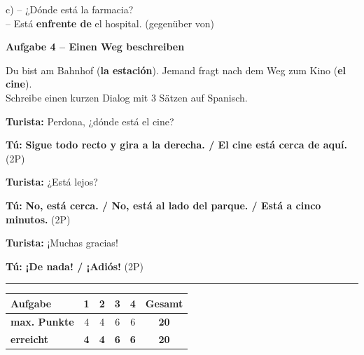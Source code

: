 \documentclass[11pt, a4paper]{article}
\newcommand{\fachfarbe}{spanisch}
\newcommand{\punktebox}[1]{\hfill\fbox{\small \_/#1}}
\newcommand{\lsg}[1]{\textcolor{loesung}{\textbf{#1}}}
\newenvironment{aufgabe}[1]{%
    \needspace{5\baselineskip}%
    \nopagebreak[4]%
    \vspace{10pt}
    \noindent\textbf{\textcolor{\fachfarbe}{Aufgabe #1}}
    \nopagebreak[4]%
    \vspace{5pt}
    \nopagebreak[4]%
    \begin{list}{}{\leftmargin=0pt}
    \item[]
}{%
    \end{list}
}
\newcommand{\es}[1]{\textcolor{\fachfarbe}{\textbf{#1}}}
\begin{document}
\noindent
c) -- ¿Dónde está la farmacia?\\
\hspace*{0.5cm} -- Está \lsg{enfrente de} el hospital. (gegenüber von)

\vspace{15pt}


\begin{aufgabe}{4 -- Einen Weg beschreiben}
Du bist am Bahnhof (\es{la estación}). Jemand fragt nach dem Weg zum Kino (\es{el cine}).\\
Schreibe einen kurzen Dialog mit 3 Sätzen auf Spanisch. \punktebox{6}
\end{aufgabe}

\noindent
\textbf{Turista:} Perdona, ¿dónde está el cine?

\vspace{0.8em}

\noindent
\textbf{Tú:} \lsg{Sigue todo recto y gira a la derecha. / El cine está cerca de aquí.} \hfill (2P)

\vspace{1.2em}

\noindent
\textbf{Turista:} ¿Está lejos?

\vspace{0.8em}

\noindent
\textbf{Tú:} \lsg{No, está cerca. / No, está al lado del parque. / Está a cinco minutos.} \hfill (2P)

\vspace{1.2em}

\noindent
\textbf{Turista:} ¡Muchas gracias!

\vspace{0.8em}

\noindent
\textbf{Tú:} \lsg{¡De nada! / ¡Adiós!} \hfill (2P)


\vspace{25pt}
\hrule
\vspace{10pt}

\noindent
\begin{tabularx}{\textwidth}{|X|c|c|c|c||c|}
\hline
\textbf{Aufgabe} & 1 & 2 & 3 & 4 & \textbf{Gesamt} \\
\hline
\textbf{max. Punkte} & 4 & 4 & 6 & 6 & \textbf{20} \\
\hline
\textbf{erreicht} & \lsg{4} & \lsg{4} & \lsg{6} & \lsg{6} & \lsg{20} \\
\hline
\end{tabularx}
\end{document}
